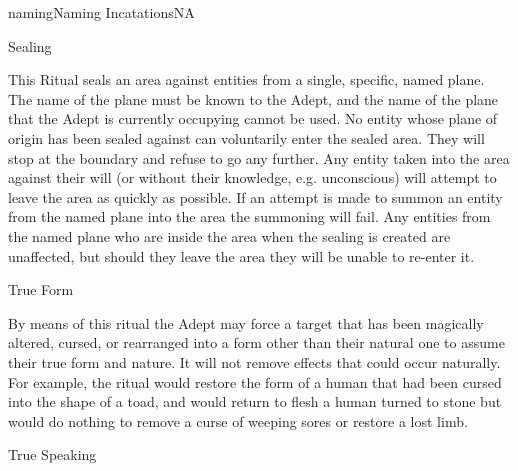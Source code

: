 \begin{College}[2.0]{naming}{Naming Incatations}{NA}
\begin{ritual}[R-5]{Sealing}

\begin{effects}
This Ritual seals an area against entities from a single, specific,
named plane. The name of the plane must be known to the Adept, and the
name of the plane that the Adept is currently occupying cannot be
used.  No entity whose plane of origin has been sealed against can
voluntarily enter the sealed area. They will stop at the boundary and
refuse to go any further.  Any entity taken into the area against
their will (or without their knowledge, e.g.  unconscious) will
attempt to leave the area as quickly as possible.  If an attempt is
made to summon an entity from the named plane into the area the
summoning will fail.  Any entities from the named plane who are inside
the area when the sealing is created are unaffected, but should they
leave the area they will be unable to re-enter it.
\end{effects}
\end{ritual}

\begin{ritual}[R-6]{True Form}
\begin{effects}
By means of this ritual the Adept may force a target that has been
magically altered, cursed, or rearranged into a form other than their
natural one to assume their true form and nature. It will not remove
effects that could occur naturally.  For example, the ritual would
restore the form of a human that had been cursed into the shape of a
toad, and would return to flesh a human turned to stone but would do
nothing to remove a curse of weeping sores or restore a lost limb.
\end{effects}
\end{ritual}

\begin{ritual}[R-7]{True Speaking}


\end{ritual}
\end{College}

